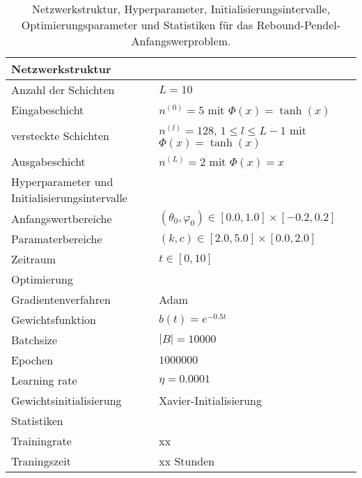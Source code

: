 \begin{table}
              \renewcommand{\arraystretch}{1.0}
              \centering
              \begin{tabular}{ l | l }
                     \hline
                     Netzwerkstruktur & \\
                     \hline
                     Anzahl der Schichten & $L=10$ \\
                     Eingabeschicht & $n^{(0)}=5$ mit $\Phi(x)=\tanh(x)$ \\
                     versteckte Schichten & $n^{(l)}=128$, $1\leq l \leq L-1$ mit $\Phi(x)=\tanh(x)$ \\
                     Ausgabeschicht & $n^{(L)}=2$ mit $\Phi(x)=x$ \\
                     \hline
                     Hyperparameter und Initialisierungsintervalle & \\
                     \hline
                     Anfangswertbereiche & $(\theta_0, \varphi_0) \in [0.0, 1.0] \times [-0.2, 0.2]$ \\
                     Paramaterbereiche & $(k, c) \in [2.0, 5.0] \times [0.0, 2.0]$ \\
                     Zeitraum & $t \in [0, 10]$ \\
                     \hline
                     Optimierung & \\
                     \hline
                     Gradientenverfahren & Adam \\
                     Gewichtsfunktion & $b(t)=e^{-0.5t}$ \\
                     Batchsize & $|B|=10000$ \\
                     Epochen & $1000000$ \\
                     Learning rate & $\eta= 0.0001$ \\
                     Gewichtsinitialisierung & Xavier-Initialisierung \\
                     \hline
                     Statistiken & \\
                     \hline
                     Trainingrate & xx \\
                     Traningszeit & xx Stunden \\
                     \hline
              \end{tabular}
       \caption{Netzwerkstruktur, Hyperparameter, Initialisierungsintervalle, Optimierungsparameter und Statistiken
       für das Rebound-Pendel-Anfangswerproblem.}
       \label{rebound-pendulum-table}
\end{table}
